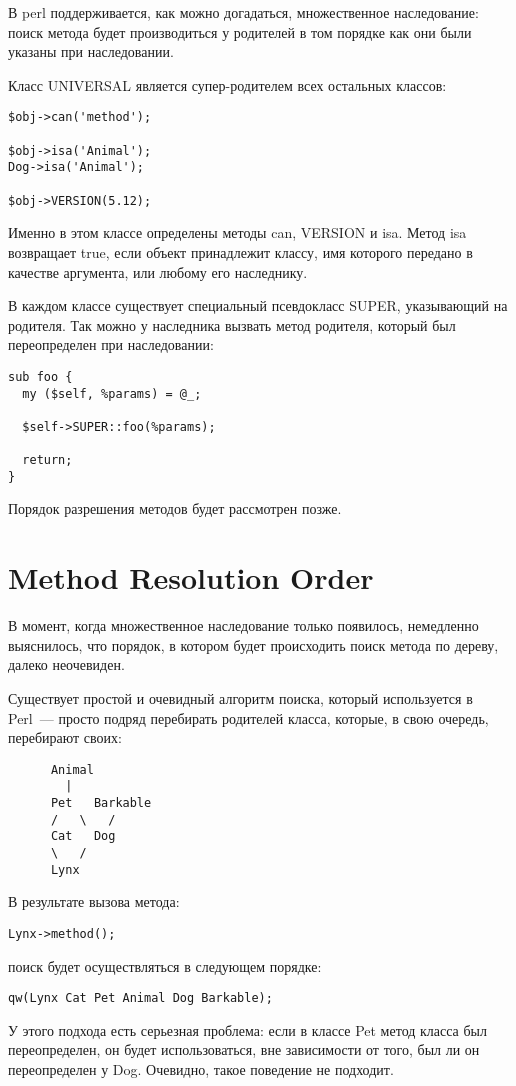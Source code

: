 В perl поддерживается, как можно догадаться, множественное наследование: поиск метода будет производиться у родителей в том порядке как они были указаны при наследовании.

Класс UNIVERSAL является супер-родителем всех остальных классов:
\begin{verbatim}
$obj->can('method');

$obj->isa('Animal');
Dog->isa('Animal');

$obj->VERSION(5.12);
\end{verbatim}
Именно в этом классе определены методы can, VERSION и isa. Метод isa возвращает true, если объект принадлежит классу, имя которого передано в качестве аргумента, или любому его наследнику.

В каждом классе существует специальный псевдокласс SUPER, указывающий на родителя. Так можно у наследника вызвать метод родителя, который был переопределен при наследовании:
\begin{verbatim}
sub foo {
  my ($self, %params) = @_;

  $self->SUPER::foo(%params);

  return;
}
\end{verbatim}
Порядок разрешения методов будет рассмотрен позже.

\section{Method Resolution Order}%
В момент, когда множественное наследование только появилось, немедленно выяснилось, что порядок, в котором будет происходить поиск метода по дереву, далеко неочевиден.

Существует простой и очевидный алгоритм поиска, который используется в Perl~--- просто подряд перебирать родителей класса, которые, в свою очередь, перебирают своих:
\begin{verbatim}
      Animal
        |
      Pet   Barkable
      /   \   /
      Cat   Dog
      \   /
      Lynx
\end{verbatim}
В результате вызова метода:
\begin{verbatim}
Lynx->method();
\end{verbatim}
поиск будет осуществляться в следующем порядке:
\begin{verbatim}
qw(Lynx Cat Pet Animal Dog Barkable);
\end{verbatim}
У этого подхода есть серьезная проблема: если в классе Pet метод класса был переопределен, он будет использоваться, вне зависимости от того, был ли он переопределен у Dog. Очевидно, такое поведение не подходит.


